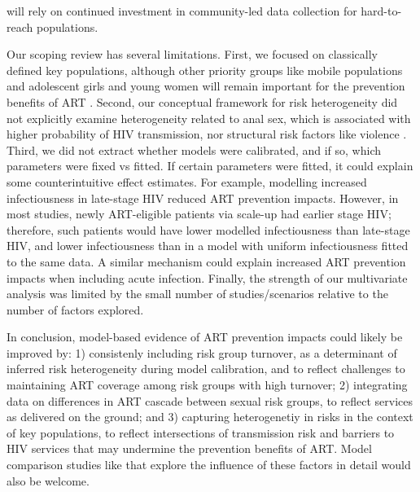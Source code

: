 will rely on continued investment in community-led data collection for hard-to-reach populations.
\par
Our scoping review has several limitations.
First, we focused on classically defined key populations,
although other priority groups like mobile populations and adolescent girls and young women
will remain important for the prevention benefits of ART \cite{Tanser2015,Dellar2015}.
Second, our conceptual framework for risk heterogeneity did not explicitly examine
heterogeneity related to anal sex, which is associated with higher probability of HIV transmission,
nor structural risk factors like violence \cite{Silverman2011,Baggaley2013}.
Third, we did not extract whether models were calibrated,
and if so, which parameters were fixed vs fitted.
If certain parameters were fitted, it could explain some counterintuitive effect estimates.
For example, modelling increased infectiousness in late-stage HIV reduced ART prevention impacts.
However, in most studies, newly ART-eligible patients via scale-up had earlier stage HIV;
therefore, such patients would have lower modelled infectiousness than late-stage HIV,
and lower infectiousness than in a model with uniform infectiousness fitted to the same data.
A similar mechanism could explain increased ART prevention impacts when including acute infection.
Finally, the strength of our multivariate analysis was limited by
the small number of studies/scenarios relative to the number of factors explored.
\par
In conclusion, model-based evidence of ART prevention impacts could likely be improved by:
1) consistenly including risk group turnover,
   as a determinant of inferred risk heterogeneity during model calibration, and
   to reflect challenges to maintaining ART coverage among risk groups with high turnover;
2) integrating data on differences in ART cascade between sexual risk groups,
   to reflect services as delivered on the ground; and
3) capturing heterogenetiy in risks in the context of key populations,
   to reflect intersections of transmission risk and barriers to HIV services
   that may undermine the prevention benefits of ART.
Model comparison studies like \cite{Dodd2010,Hontelez2013} that explore
the influence of these factors in detail would also be welcome.